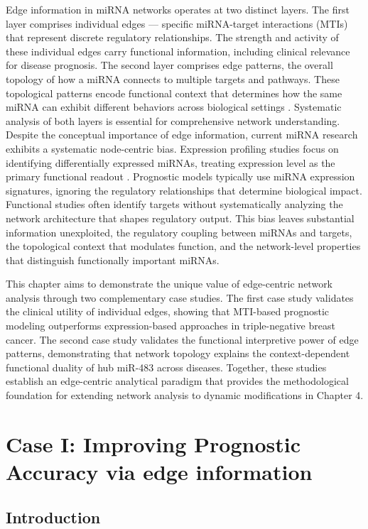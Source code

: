 Edge information in miRNA networks operates at two distinct layers. The first layer comprises individual edges --- specific miRNA-target interactions (MTIs) that represent discrete regulatory relationships. The strength and activity of these individual edges carry functional information, including clinical relevance for disease prognosis. The second layer comprises edge patterns, the overall topology of how a miRNA connects to multiple targets and pathways. These topological patterns encode functional context that determines how the same miRNA can exhibit different behaviors across biological settings \cite{assidick2022targetin}. Systematic analysis of both layers is essential for comprehensive network understanding. Despite the conceptual importance of edge information, current miRNA research exhibits a systematic node-centric bias. Expression profiling studies focus on identifying differentially expressed miRNAs, treating expression level as the primary functional readout \cite{kalecky2020integrat}. Prognostic models typically use miRNA expression signatures, ignoring the regulatory relationships that determine biological impact. Functional studies often identify targets without systematically analyzing the network architecture that shapes regulatory output. This bias leaves substantial information unexploited, the regulatory coupling between miRNAs and targets, the topological context that modulates function, and the network-level properties that distinguish functionally important miRNAs.

This chapter aims to demonstrate the unique value of edge-centric network analysis through two complementary case studies. The first case study validates the clinical utility of individual edges, showing that MTI-based prognostic modeling outperforms expression-based approaches in triple-negative breast cancer. The second case study validates the functional interpretive power of edge patterns, demonstrating that network topology explains the context-dependent functional duality of hub miR-483 across diseases. Together, these studies establish an edge-centric analytical paradigm that provides the methodological foundation for extending network analysis to dynamic modifications in Chapter 4.

\section{Case I: Improving Prognostic Accuracy via edge information}

\subsection{Introduction}

